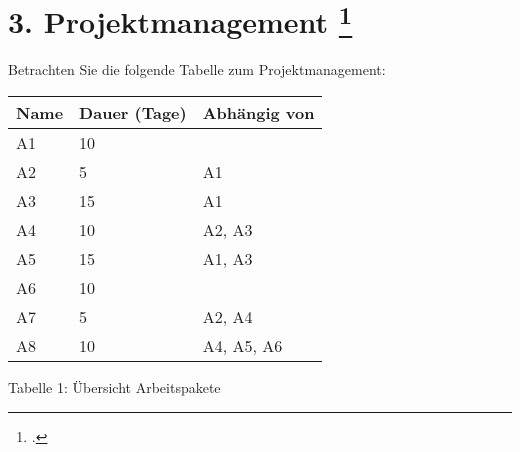 \documentclass{bschlangaul-aufgabe}
\begin{document}

\section{3. Projektmanagement
\footcite[Thema 1 Teilaufgabe 1 Aufgabe 3]{examen:46116:2015:09}}

Betrachten Sie die folgende Tabelle zum Projektmanagement:

\begin{center}
\begin{tabular}{|l|l|l|}
\hline
Name & Dauer (Tage) & Abhängig von\\\hline\hline
A1 & 10 & \\\hline
A2 & 5  & A1 \\\hline
A3 & 15 & A1 \\\hline
A4 & 10 & A2, A3 \\\hline
A5 & 15 & A1, A3 \\\hline
A6 & 10 & \\\hline
A7 & 5  & A2, A4 \\\hline
A8 & 10 & A4, A5, A6 \\\hline
\end{tabular}
\end{center}

Tabelle 1: Übersicht Arbeitspakete
\end{document}
